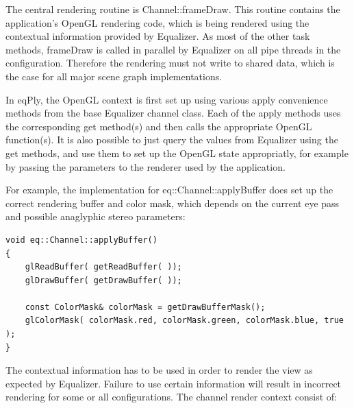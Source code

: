 \documentclass[10pt,a4]{scrartcl}
\begin{document}
The central rendering routine is \textsf{Channel::frameDraw}. This
routine contains the application's OpenGL rendering code, which is being
rendered using the contextual information provided by Equalizer. As most
of the other task methods, \textsf{frameDraw} is called in parallel by
Equalizer on all pipe threads in the configuration. Therefore the
rendering must not write to shared data, which is the case for all major
scene graph implementations.

In \textsf{eqPly}, the OpenGL context is first set up using various
\textsf{apply} convenience methods from the base Equalizer channel
class. Each of the \textsf{apply} methods uses the corresponding
\textsf{get} method(s) and then calls the appropriate OpenGL
function(s). It is also possible to just query the values from Equalizer
using the \textsf{get} methods, and use them to set up the OpenGL state
appropriatly, for example by passing the parameters to the renderer used
by the application.

For example, the implementation for \textsf{eq::Channel::applyBuffer}
does set up the correct rendering buffer and color mask, which depends
on the current eye pass and possible anaglyphic stereo parameters:

{\footnotesize\begin{lstlisting}
void eq::Channel::applyBuffer()
{
    glReadBuffer( getReadBuffer( ));
    glDrawBuffer( getDrawBuffer( ));
    
    const ColorMask& colorMask = getDrawBufferMask();
    glColorMask( colorMask.red, colorMask.green, colorMask.blue, true );
}
\end{lstlisting}}

The contextual information has to be used in order to render the view as
expected by Equalizer. Failure to use certain information will result in
incorrect rendering for some or all configurations. The channel render
context consist of:
\end{document}

